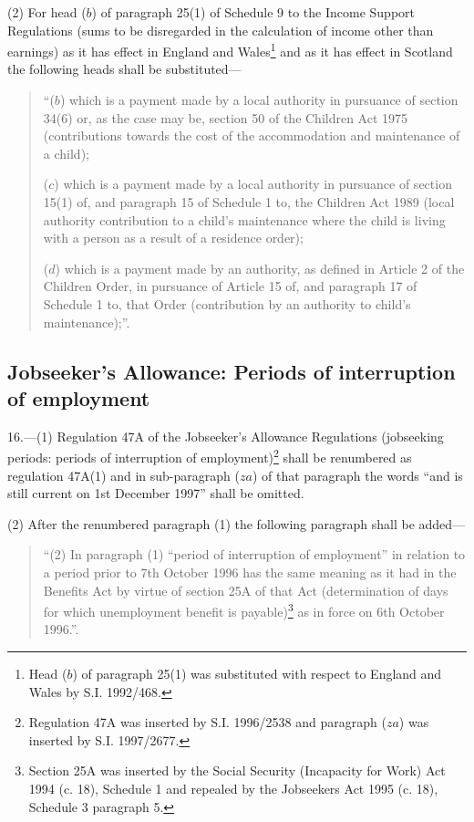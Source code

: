 \documentclass[12pt,a4paper]{article}
\begin{document}
(2) For head ($b$)  of paragraph 25(1) of Schedule 9 to the Income Support Regulations (sums to be disregarded in the calculation of income other than earnings) as it has effect in England and Wales\footnote{\frenchspacing Head ($b$) of paragraph 25(1) was substituted with respect to England and Wales by S.I. 1992/468.} and as it has effect in Scotland the following heads shall be substituted—
\begin{quotation}
“($b$) which is a payment made by a local authority in pursuance of section 34(6) or, as the case may be, section 50 of the Children Act 1975 (contributions towards the cost of the accommodation and maintenance of a child);

($c$) which is a payment made by a local authority in pursuance of section 15(1) of, and paragraph 15 of Schedule 1 to, the Children Act 1989 (local authority contribution to a child’s maintenance where the child is living with a person as a result of a residence order);

($d$) which is a payment made by an authority, as defined in Article 2 of the Children Order, in pursuance of Article 15 of, and paragraph 17 of Schedule 1 to, that Order (contribution by an authority to child’s maintenance);”.
\end{quotation}

\subsection[16. Jobseeker’s Allowance: Periods of interruption of employment]{Jobseeker’s Allowance: Periods of interruption of employment}

16.---(1)  Regulation 47A of the Jobseeker’s Allowance Regulations (jobseeking periods: periods of interruption of employment)\footnote{\frenchspacing Regulation 47A was inserted by S.I. 1996/2538 and paragraph ($za$) was inserted by S.I. 1997/2677.} shall be renumbered as regulation 47A(1) and in sub-paragraph ($za$)  of that paragraph the words “and is still current on 1st December 1997” shall be omitted.

(2) After the renumbered paragraph (1) the following paragraph shall be added—
\begin{quotation}
“(2) In paragraph (1) “period of interruption of employment” in relation to a period prior to 7th October 1996 has the same meaning as it had in the Benefits Act by virtue of section 25A of that Act (determination of days for which unemployment benefit is payable)\footnote{\frenchspacing Section 25A was inserted by the Social Security (Incapacity for Work) Act 1994 (c. 18), Schedule 1 and repealed by the Jobseekers Act 1995 (c. 18), Schedule 3 paragraph 5.} as in force on 6th October 1996.”.
\end{quotation}
\end{document}
